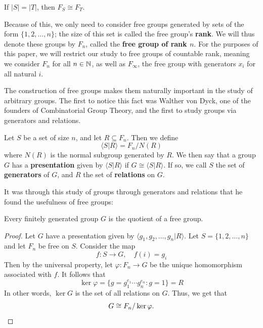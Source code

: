 \begin{thm}\label{Free Groups From Generating Sets of Same Cardinality are Isomorphic}
    If $|S| = |T|$, then $F_S \cong F_T$. 
\end{thm}

Because of this, we only need to consider free groups generated by sets of the form $\{1,2,\ldots, n\}$; the size of this set is called the free group's \textbf{rank}. We will thus denote these groups by $F_n$, called the \textbf{free group of rank $n$}. For the purposes of this paper, we will restrict our study to free groups of countable rank, meaning we consider $F_n$ for all $n \in \mathbb{N}$, as well as $F_\infty$, the free group with generators $x_i$ for all natural $i$.

The construction of free groups makes them naturally important in the study of arbitrary groups. The first to notice this fact was Walther von Dyck, one of the founders of Combinatorial Group Theory, and the first to study groups via generators and relations. 

\begin{defn}
    Let $S$ be a set of size $n$, and let $R \subseteq F_n$. Then we define 
    \[ \langle S|R \rangle = F_n/N(R) \]
    where $N(R)$ is the normal subgroup generated by $R$. We then say that a group $G$ has a \textbf{presentation} given by $\langle S|R \rangle$ if $G \cong \langle S|R \rangle$. If so, we call $S$ the set of \textbf{generators} of $G$, and $R$ the set of \textbf{relations} on $G$. 
\end{defn}

\noindent It was through this study of groups through generators and relations that he found the usefulness of free groups:

\begin{thm}\label{Groups are Quotients of Free Groups}
    Every finitely generated group $G$ is the quotient of a free group. 
\end{thm}

\begin{proof}
    Let $G$ have a presentation given by $\langle g_1, g_2, \ldots, g_n | R \rangle$. Let $S = \{1, 2, \ldots, n\}$ and let $F_n$ be free on $S$. Consider the map 
    \[f: S \to G, \quad f(i) = g_i\]
    Then by the universal property, let $\varphi: F_n \to G$ be the unique homomorphism associated with $f$. It follows that
    \[\ker\varphi = \{g = g_1^{e_1}\cdots g_n^{e_n} : g = 1\} = R\]
    In other words, $\ker G$ is the set of all relations on $G$. Thus, we get that 
    \[G \cong F_n/\ker\varphi. \qedhere\]
\end{proof}

